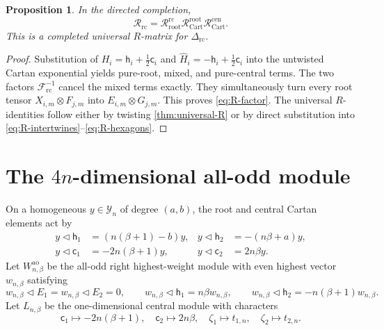 \documentclass[11pt,a4paper]{article}
\newcommand{\ot}{\otimes}
\newcommand{\tri}{\mathbin{\triangleleft}}
\newcommand{\ao}{\mathrm{ao}}
\newcommand{\rc}{\mathrm{rc}}
\newcommand{\cen}{\mathrm{cen}}
\newcommand{\rootpart}{\mathrm{root}}
\newtheorem{proposition}[theorem]{Proposition}
\theoremstyle{definition}
\theoremstyle{remark}
\begin{document}
\begin{proposition}\label{prop:R-factor}
In the directed completion,
\begin{equation}\label{eq:R-factor}
 \mathcal R_{\rc}
 =
 \mathcal R_{\rootpart}^{\rc}
 \mathcal R_{\mathrm{Cart}}^{\rootpart}
 \mathcal R_{\mathrm{Cart}}^{\cen}.
\end{equation}
This is a completed universal \(R\)-matrix for
\(\Delta_{\rc}\).
\end{proposition}

\begin{proof}
Substitution of
\(H_i=\mathsf h_i+\frac12\mathsf c_i\) and
\(\widehat H_i=-\mathsf h_i+\frac12\mathsf c_i\) into the untwisted
Cartan exponential yields pure-root, mixed, and pure-central terms.
The two factors \(\mathcal F_{\rc}^{-1}\) cancel the mixed terms exactly.
They simultaneously turn every root tensor
\(X_{i,m}\ot F_{j,m}\) into \(E_{i,m}\ot G_{j,m}\).
This proves \eqref{eq:R-factor}.  The universal \(R\)-identities follow
either by twisting \cref{thm:universal-R} or by direct substitution into
\eqref{eq:R-intertwines}--\eqref{eq:R-hexagons}.
\end{proof}

\section[The 4n-dimensional all-odd module]
{The \(4n\)-dimensional all-odd module}\label{sec:module}

On a homogeneous \(y\in\mathcal Y_n\) of degree \((a,b)\), the root and
central Cartan elements act by
\begin{equation}\label{eq:root-center-actions}
\begin{aligned}
 y\tri\mathsf h_1&=(n(\beta+1)-b)y,&
 y\tri\mathsf h_2&=-(n\beta+a)y,\\
 y\tri\mathsf c_1&=-2n(\beta+1)y,&
 y\tri\mathsf c_2&=2n\beta y.
\end{aligned}
\end{equation}
Let \(W_{n,\beta}^{\ao}\) be the all-odd right highest-weight module with
even highest vector \(w_{n,\beta}\) satisfying
\begin{equation}\label{eq:highest-weight}
 w_{n,\beta}\tri E_1=w_{n,\beta}\tri E_2=0,\qquad
 w_{n,\beta}\tri\mathsf h_1=n\beta w_{n,\beta},\qquad
 w_{n,\beta}\tri\mathsf h_2=-n(\beta+1)w_{n,\beta}.
\end{equation}
Let \(L_{n,\beta}\) be the one-dimensional central module with characters
\[
 \mathsf c_1\mapsto-2n(\beta+1),\quad
 \mathsf c_2\mapsto2n\beta,\quad
 \zeta_1\mapsto t_{1,n},\quad
 \zeta_2\mapsto t_{2,n}.
\]
\end{document}
